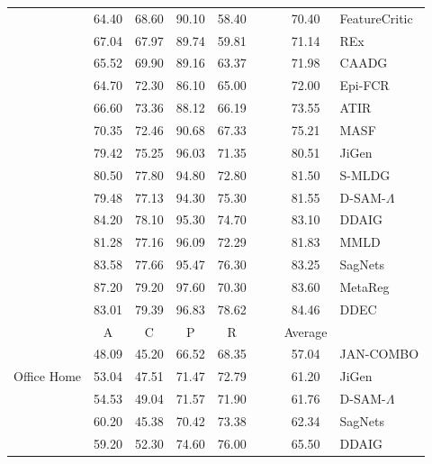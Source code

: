 \documentclass{article}
\begin{document}
\begin{table}
\begin{center}
\begin{small}
{\begin{tabular}{p{1.5cm}cccccccl}
& 64.40 & 68.60 & 90.10 & 58.40 &       &       & 70.40 & FeatureCritic \citep{li2019feature}\\
& 67.04 & 67.97 & 89.74 & 59.81 &       &       & 71.14 & REx \citep{krueger2020out}\\
& 65.52 & 69.90 & 89.16 & 63.37 &       &       & 71.98 & CAADG \citep{rahman2019correlation}\\
& 64.70 & 72.30 & 86.10 & 65.00 &       &       & 72.00 & Epi-FCR \citep{li2019episodic}\\
& 66.60 & 73.36 & 88.12 & 66.19 &       &       & 73.55 & ATIR \citep{albuquerque2019a}\\
& 70.35 & 72.46 & 90.68 & 67.33 &       &       & 75.21 & MASF \citep{dou2019domain}\\
& 79.42 & 75.25 & 96.03 & 71.35 &       &       & 80.51 & JiGen \citep{carlucci2019domain}\\
& 80.50 & 77.80 & 94.80 & 72.80 &       &       & 81.50 & S-MLDG \citep{li2020sequential}\\
& 79.48 & 77.13 & 94.30 & 75.30 &       &       & 81.55 & D-SAM-$\Lambda$ \citep{d2018domain}\\
& 84.20 & 78.10 & 95.30 & 74.70 &       &       & 83.10 & DDAIG \citep{zhou2020deep}\\
& 81.28 & 77.16 & 96.09 & 72.29 &       &       & 81.83 & MMLD \citep{matsuura2019domain}\\
& 83.58 & 77.66 & 95.47 & 76.30 &       &       & 83.25 & SagNets \citep{nam2019reducing}\\
& 87.20 & 79.20 & 97.60 & 70.30 &       &       & 83.60 & MetaReg \citep{balaji2018metareg}\\
& 83.01 & 79.39 & 96.83 & 78.62 &       &       & 84.46 & DDEC \citep{asadi2019towards}\\
\midrule
\multirow{5}{1.5cm}{Office Home}%
&     A &     C &     P &     R &       &       & Average & \\
& 48.09 & 45.20 & 66.52 & 68.35 &       &       & 57.04 & JAN-COMBO \citep{rahman2019multi}\\
& 53.04 & 47.51 & 71.47 & 72.79 &       &       & 61.20 & JiGen \citep{carlucci2019domain}\\
& 54.53 & 49.04 & 71.57 & 71.90 &       &       & 61.76 & D-SAM-$\Lambda$ \citep{d2018domain}\\
& 60.20 & 45.38 & 70.42 & 73.38 &       &       & 62.34 & SagNets \citep{nam2019reducing}\\
& 59.20 & 52.30 & 74.60 & 76.00 &       &       & 65.50 & DDAIG \citep{zhou2020deep}\\
\bottomrule
\end{tabular}
}
\end{small}
\end{center}
\label{table:sota_review}
\end{table}
\end{document}
